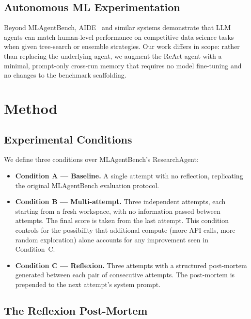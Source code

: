 \documentclass[conference]{IEEEtran}
\begin{document}
\subsection{Autonomous ML Experimentation}

Beyond MLAgentBench, AIDE~\cite{weco2024aide} and similar systems demonstrate
that LLM agents can match human-level performance on competitive data science
tasks when given tree-search or ensemble strategies. Our work differs in scope:
rather than replacing the underlying agent, we augment the ReAct agent with a
minimal, prompt-only cross-run memory that requires no model fine-tuning and
no changes to the benchmark scaffolding.

\section{Method}

\subsection{Experimental Conditions}

We define three conditions over MLAgentBench's ResearchAgent:

\begin{itemize}
  \item \textbf{Condition A --- Baseline.} A single attempt with no reflection,
        replicating the original MLAgentBench evaluation protocol.
  \item \textbf{Condition B --- Multi-attempt.} Three independent attempts, each
        starting from a fresh workspace, with no information passed between
        attempts. The final score is taken from the last attempt. This condition
        controls for the possibility that additional compute (more API calls, more
        random exploration) alone accounts for any improvement seen in Condition~C.
  \item \textbf{Condition C --- Reflexion.} Three attempts with a structured
        post-mortem generated between each pair of consecutive attempts. The
        post-mortem is prepended to the next attempt's system prompt.
\end{itemize}

\subsection{The Reflexion Post-Mortem}
\end{document}
